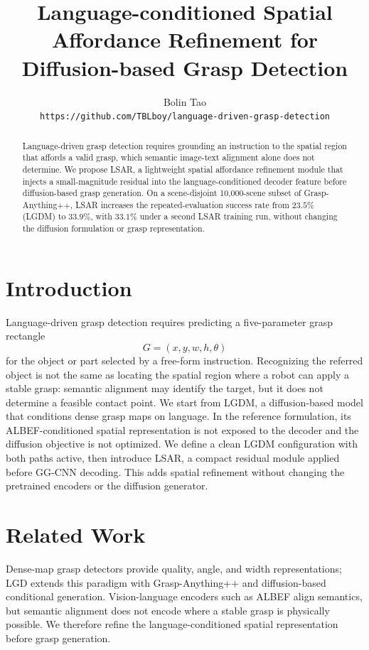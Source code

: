 \documentclass[10pt,twocolumn,letterpaper]{article}
\title{Language-conditioned Spatial Affordance Refinement for Diffusion-based Grasp Detection}
\author{Bolin Tao\\
\texttt{https://github.com/TBLboy/language-driven-grasp-detection}}
\begin{document}
\maketitle

\begin{abstract}
Language-driven grasp detection requires grounding an instruction to the
spatial region that affords a valid grasp, which semantic image-text alignment
alone does not determine.  We propose LSAR, a lightweight spatial affordance
refinement module that injects a small-magnitude residual into the
language-conditioned decoder feature before diffusion-based grasp generation.
On a scene-disjoint 10{,}000-scene subset of Grasp-Anything++, LSAR increases
the repeated-evaluation success rate from $23.5\%$ (LGDM) to $33.9\%$, with
$33.1\%$ under a second LSAR training run, without changing the diffusion
formulation or grasp representation.
\end{abstract}

\section{Introduction}
Language-driven grasp detection requires predicting a five-parameter grasp
rectangle
\begin{equation}
  G=(x, y, w, h, \theta)
  \label{eq:grasp}
\end{equation}
for the object or part selected by a free-form instruction.  Recognizing the
referred object is not the same as locating the spatial region where a robot
can apply a stable grasp: semantic alignment may identify the target, but it
does not determine a feasible contact point.  We start from LGDM, a
diffusion-based model that conditions dense grasp maps on language.  In the
reference formulation, its ALBEF-conditioned spatial representation is not
exposed to the decoder and the diffusion objective is not optimized.  We
define a clean LGDM configuration with both paths active, then introduce
LSAR, a compact residual module applied before GG-CNN decoding.  This adds
spatial refinement without changing the pretrained encoders or the diffusion
generator.

\section{Related Work}
Dense-map grasp detectors \cite{morrison2018closing,kumra2020grconvnet}
provide quality, angle, and width representations; LGD
\cite{vuong2024lgd} extends this paradigm with Grasp-Anything++
\cite{vuong2023graspanything} and diffusion-based conditional generation.
Vision-language encoders such as ALBEF \cite{li2021albef} align semantics, but
semantic alignment does not encode where a stable grasp is physically
possible.  We therefore refine the language-conditioned spatial representation
before grasp generation.
\end{document}
